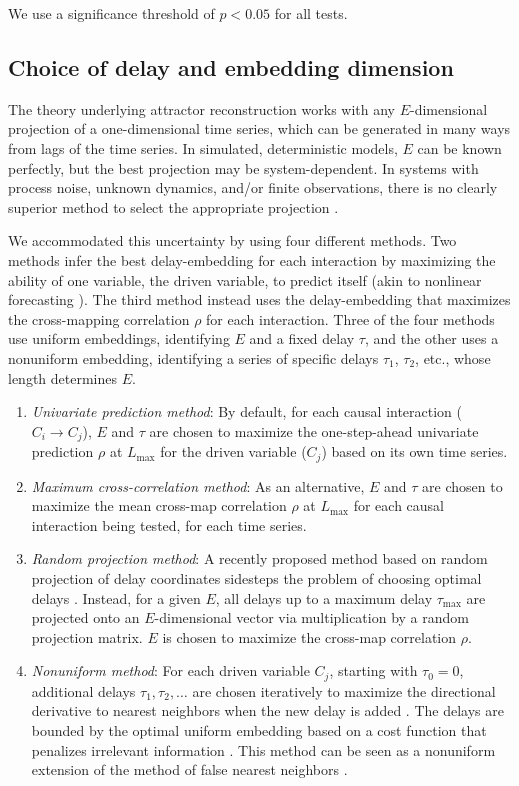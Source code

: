 \documentclass[10pt,letterpaper]{article}
\begin{document}
We use a significance threshold of $p<0.05$ for all tests.

\subsection*{Choice of delay and embedding dimension}
The theory underlying attractor reconstruction works with any $E$-dimensional projection of a one-dimensional time series, which can be generated in many ways from lags of the time series.
In simulated, deterministic models, $E$ can be known perfectly, but the best projection may be system-dependent.
In systems with process noise, unknown dynamics, and/or finite observations, there is no clearly superior method to select the appropriate projection \cite{Casdagli1991,Nichkawde2013,Uzal2011,Pecora2007, Cao1997, Small2004}.

We accommodated this uncertainty by using four different methods.
Two methods infer the best delay-embedding for each interaction by maximizing the ability of one variable, the driven variable, to predict itself (akin to nonlinear forecasting \cite{Sugihara1990, Sugihara1994}).
The third method instead uses the delay-embedding that maximizes the cross-mapping correlation $\rho$ for each interaction.
Three of the four methods use uniform embeddings, identifying $E$ and a fixed delay $\tau$, and the other uses a nonuniform embedding, identifying a series of specific delays $\tau_1$, $\tau_2$, etc., whose length determines $E$.

\begin{enumerate}
\item \textit{Univariate prediction method}: By default, for each causal interaction ($C_i \rightarrow C_j$), $E$ and $\tau$ are chosen to maximize the one-step-ahead univariate prediction $\rho$ at $L_{\max}$ for the driven variable ($C_j$) based on its own time series.
\item \textit{Maximum cross-correlation method}: As an alternative, $E$ and $\tau$ are chosen to maximize the mean cross-map correlation $\rho$ at $L_\text{max}$ for each causal interaction being tested, for each time series.
\item \textit{Random projection method}: A recently proposed method based on random projection of delay coordinates sidesteps the problem of choosing optimal delays \cite{Tajima2015}. Instead, for a given $E$, all delays up to a maximum delay $\tau_{\max}$ are projected onto an $E$-dimensional vector via multiplication by a random projection matrix. $E$ is chosen to maximize the cross-map correlation $\rho$.
\item \textit{Nonuniform method}: For each driven variable $C_j$, starting with $\tau_0 = 0$, additional delays $\tau_1, \tau_2, \ldots$ are chosen iteratively to maximize the directional derivative to nearest neighbors when the new delay is added \cite{Nichkawde2013}. The delays are bounded by the optimal uniform embedding based on a cost function that penalizes irrelevant information \cite{Uzal2011}. This method can be seen as a nonuniform extension of the method of false nearest neighbors \cite{Kennel1992}.
\end{enumerate}
\end{document}
